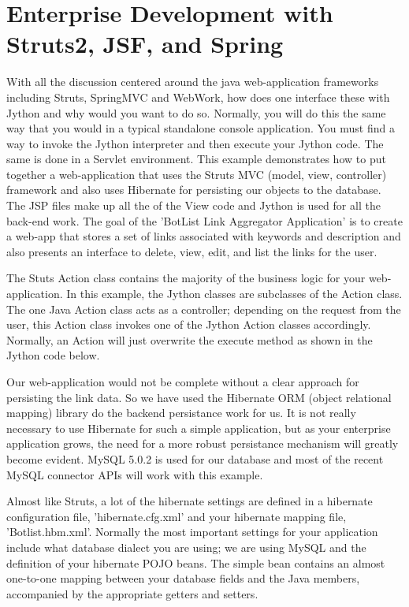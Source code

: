 \chapter{Enterprise Development with Struts2, JSF, and Spring}

With all the discussion centered around the java web-application frameworks
including Struts, SpringMVC and WebWork, how does one interface these with
Jython and why would you want to do so. Normally, you will do this the same way
that you would in a typical standalone console application. You must find a way
to invoke the Jython interpreter and then execute your Jython code. The same is
done in a Servlet environment. This example demonstrates how to put together a
web-application that uses the Struts MVC (model, view, controller) framework and
also uses Hibernate for persisting our objects to the database. The JSP files
make up all the of the View code and Jython is used for all the back-end work.
The goal of the 'BotList  Link Aggregator Application' is to create a web-app
that stores a set of links associated with keywords and description and also
presents an interface to delete, view, edit, and list the links for the user.

The Stuts Action class contains the majority of the business logic for your
web-application. In this example, the Jython classes are subclasses of the
Action class. The one Java Action class acts as a controller; depending on the
request from the user, this Action class invokes one of the Jython Action
classes accordingly. Normally, an Action will just overwrite the execute method
as shown in the Jython code below.

Our web-application would not be complete without a clear approach for
persisting the link data. So we have used the Hibernate ORM (object relational
mapping) library do the backend persistance work for us. It is not really
necessary to use Hibernate for such a simple application, but as your enterprise
application grows, the need for a more robust persistance mechanism will greatly
become evident. MySQL 5.0.2 is used for our database and most of the recent
MySQL connector APIs will work with this example.

Almost like Struts, a lot of the hibernate settings are defined in a hibernate
configuration file, 'hibernate.cfg.xml' and your hibernate mapping file,
'Botlist.hbm.xml'. Normally the most important settings for your application
include what database dialect you are using; we are using MySQL and the
definition of your hibernate POJO beans. The simple bean contains an almost
one-to-one mapping between your database fields and the Java members,
accompanied by the appropriate getters and setters.
